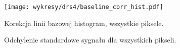 \documentclass[a4paper,11pt,twoside]{article}
\begin{document}
\begin{figure}[H] 
\centering
\texttt{[image: wykresy/drs4/baseline\_corr\_hist.pdf]}
\caption{Korekcja linii bazowej histogram, wszystkie piksele.}
\label{fig:baseline_corr_hist}
\end{figure}

\begin{figure}[H]
\label{mc_pek}
  \begin{center}
  \hfill
  \caption{Odchylenie standardowe sygnału dla wszystkich pikseli.}
\end{center}
\end{figure}
\newpage
\end{document}
